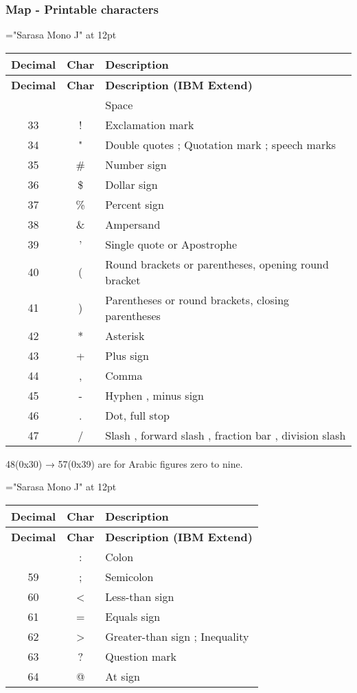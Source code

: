 \subsubsection{Map - Printable characters}

{\font\rm="Sarasa Mono J" at 12pt \rm 
\begin{longtable}{|c|c|l|}
	\hline
	\textbf{Decimal} & \textbf{Char} & \textbf{Description} \\
	\hline\endfirsthead\hline
	\textbf{Decimal} & \textbf{Char} & \textbf{Description (IBM Extend)} \\
	\hline\endhead\hline\endfoot\hline\endlastfoot
32 &   & Space \\\hline
33 & ! & Exclamation mark \\\hline
34 & " & Double quotes ; Quotation mark ; speech marks \\\hline
35 & \#& Number sign \\\hline
36 & \$& Dollar sign \\\hline
37 & \%& Percent sign \\\hline
38 & \&& Ampersand \\\hline
39 & ' & Single quote or Apostrophe \\\hline
40 & ( & Round brackets or parentheses, opening round bracket \\\hline
41 & ) & Parentheses or round brackets, closing parentheses \\\hline
42 & * & Asterisk \\\hline
43 & + & Plus sign \\\hline
44 & , & Comma \\\hline
45 & - & Hyphen , minus sign \\\hline
46 & . & Dot, full stop \\\hline
47 & / & Slash , forward slash , fraction bar , division slash \\\hline
\end{longtable}
}

48(0x30) → 57(0x39) are for Arabic figures zero to nine. 

{\font\rm="Sarasa Mono J" at 12pt \rm 
\begin{longtable}{|c|c|l|}
	\hline
	\textbf{Decimal} & \textbf{Char} & \textbf{Description} \\
	\hline\endfirsthead\hline
	\textbf{Decimal} & \textbf{Char} & \textbf{Description (IBM Extend)} \\
	\hline\endhead\hline\endfoot\hline\endlastfoot
58 & : & Colon \\\hline
59 & ; & Semicolon \\\hline
60 & < & Less-than sign \\\hline
61 & = & Equals sign \\\hline
62 & > & Greater-than sign ; Inequality \\\hline
63 & ? & Question mark \\\hline
64 & @ & At sign \\\hline
\end{longtable}
}

